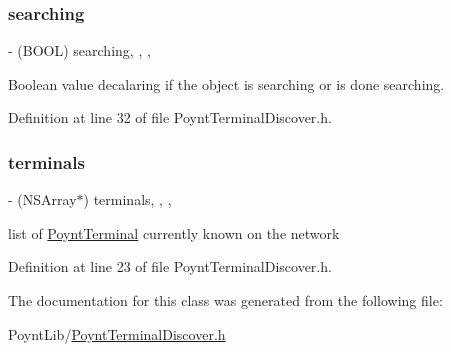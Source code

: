 \subsubsection{\texorpdfstring{searching}{searching}}
{\footnotesize\ttfamily -\/ (B\+O\+OL) searching\hspace{0.3cm}{\ttfamily [read]}, {\ttfamily [write]}, {\ttfamily [nonatomic]}, {\ttfamily [assign]}}



Boolean value decalaring if the object is searching or is done searching. 



Definition at line 32 of file Poynt\+Terminal\+Discover.\+h.

\hypertarget{interface_poynt_terminal_discover_a5388c2786127d007a5b553986779ee46}{}\label{interface_poynt_terminal_discover_a5388c2786127d007a5b553986779ee46} 
\subsubsection{\texorpdfstring{terminals}{terminals}}
{\footnotesize\ttfamily -\/ (N\+S\+Array$\ast$) terminals\hspace{0.3cm}{\ttfamily [read]}, {\ttfamily [write]}, {\ttfamily [nonatomic]}, {\ttfamily [strong]}}



list of \hyperlink{interface_poynt_terminal}{Poynt\+Terminal} currently known on the network 



Definition at line 23 of file Poynt\+Terminal\+Discover.\+h.



The documentation for this class was generated from the following file\+:\begin{DoxyCompactItemize}
\item 
Poynt\+Lib/\hyperlink{_poynt_terminal_discover_8h}{Poynt\+Terminal\+Discover.\+h}\end{DoxyCompactItemize}
